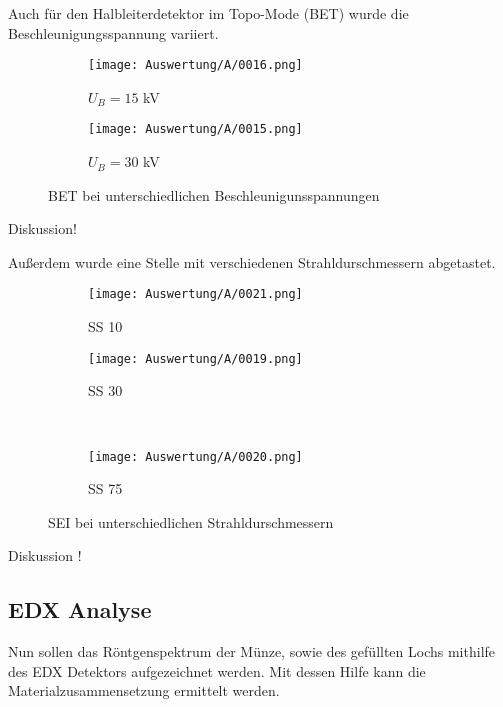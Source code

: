 \newpage
Auch für den Halbleiterdetektor im Topo-Mode (BET) wurde die Beschleunigungsspannung variiert.
\begin{figure}[h]
    \centering
    
    \begin{subfigure}[b]{0.45\textwidth}
        \centering
        \texttt{[image: Auswertung/A/0016.png]}
        \caption{$U_B = 15$ kV}
    \end{subfigure}
    \hfill
    \begin{subfigure}[b]{0.45\textwidth}
        \centering
        \texttt{[image: Auswertung/A/0015.png]}
        \caption{$U_B = 30$ kV}
    \end{subfigure}
    
    \caption{BET bei unterschiedlichen Beschleunigunsspannungen}
\end{figure}

Diskussion!

\newpage
Außerdem wurde eine Stelle mit verschiedenen Strahldurschmessern abgetastet.
\begin{figure}[h]
    \centering
    
    \begin{subfigure}[b]{0.45\textwidth}
        \centering
        \texttt{[image: Auswertung/A/0021.png]}
        \caption{SS 10}
    \end{subfigure}
    \hfill
    \begin{subfigure}[b]{0.45\textwidth}
        \centering
        \texttt{[image: Auswertung/A/0019.png]}
        \caption{SS 30}
    \end{subfigure}
    \\
    \begin{subfigure}[b]{0.45\textwidth}
        \centering
        \texttt{[image: Auswertung/A/0020.png]}
        \caption{SS 75}
    \end{subfigure}
    \caption{SEI bei unterschiedlichen Strahldurschmessern}
\end{figure}

Diskussion !

\newpage
\subsection{EDX Analyse}
Nun sollen das Röntgenspektrum der Münze, sowie des gefüllten Lochs mithilfe des EDX Detektors aufgezeichnet werden. Mit dessen Hilfe kann die Materialzusammensetzung ermittelt werden. \\

